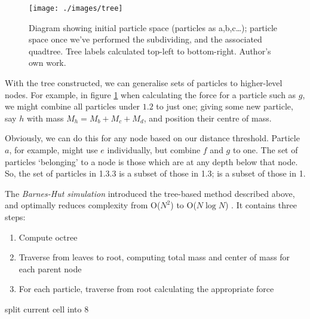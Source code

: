 \documentclass[11pt,a4paper]{article}
\begin{document}
\begin{figure}[h!]
\centering
\texttt{[image: ./images/tree]}
\caption[Barnes-Hut subdivision of particle-space, and associated tree diagram]{Diagram showing initial particle space (particles as a,b,c\ldots); particle space once we've performed the subdividing, and the associated quadtree. Tree labels calculated top-left to bottom-right. Author's own work.}
\label{msPaintTreeDiag}
\end{figure}

With the tree constructed, we can generalise sets of particles to higher-level nodes. For example, in figure \ref{msPaintTreeDiag} when calculating the force for a particle such as $g$, we might combine all particles under $1.2$ to just one; giving some new particle, say $h$ with mass $M_h = M_b + M_c + M_d$, and position their centre of mass. 

Obviously, we can do this for any node based on our distance threshold. Particle $a$, for example, might use $e$ individually, but combine $f$ and $g$ to one. 
The set of particles `belonging' to a node is those which are at any depth below that node. So, the set of particles in 1.3.3 is a subset of those in 1.3; is a subset of those in 1.

The \emph{Barnes-Hut simulation} introduced the tree-based method described above, and optimally reduces complexity from O($N^2$) to O($N \log N$) \cite{barneshut}. It contains three steps:

\begin{enumerate}
\item Compute octree
\item Traverse from leaves to root, computing total mass and center of mass for each parent node
\item For each particle, traverse from root calculating the appropriate force 
\end{enumerate}

\begin{algorithm}[H]
\caption{Function to recursively subdivide cells until all particles on leaves. (As in fig \ref{msPaintTreeDiag}, appendix \ref{barnesHutImg})}

\begin{algorithmic}
\STATE split current cell into 8
  \ENDIF
\ENDFOR
\end{algorithmic}
\end{algorithm}
\end{document}
